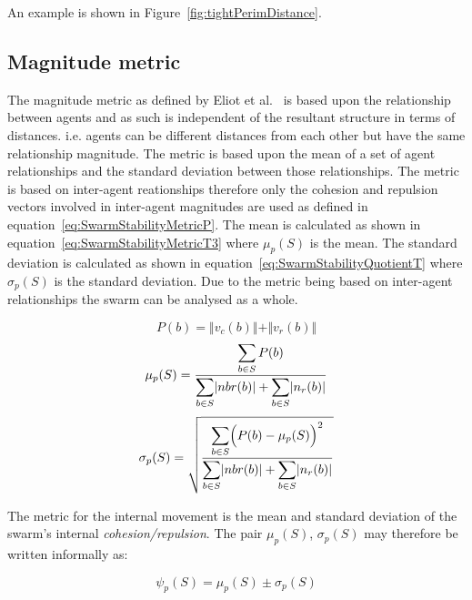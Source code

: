 \documentclass[12pt,a4paper]{IEEEtran}
\newcommand{\magn}[1]{\Vert{#1}\Vert}
\newcommand{\card}[1]{\vert{#1}\vert}
\begin{document}
An example is shown in Figure~\ref{fig:tightPerimDistance}.

\subsection{Magnitude metric}
The magnitude metric as defined by Eliot et al.~\cite{eliot2018metric} is based upon the relationship between agents and as such is independent of the resultant structure in terms of distances. i.e. agents can be different distances from each other but have the same relationship magnitude.
The metric is based upon the mean of a set of agent relationships and the standard deviation between those relationships. The metric is based on inter-agent reationships therefore only the cohesion and repulsion vectors involved in inter-agent magnitudes are used as defined in equation~\ref{eq:SwarmStabilityMetricP}. The mean is calculated as shown in equation~\ref{eq:SwarmStabilityMetricT3} where $\mu_p(S)$ is the mean. The standard deviation is calculated as shown in equation~\ref{eq:SwarmStabilityQuotientT} where $\sigma_p(S)$ is the standard deviation. Due to the metric being based on inter-agent relationships the swarm can be analysed as a whole.

\small
\begin{equation}\label{eq:SwarmStabilityMetricP}
	P(b) = \magn{v_c(b)} + \magn{v_r(b)}
\end{equation}
\begin{equation}\label{eq:SwarmStabilityMetricT3}
	\mu_p(S) = \frac{\mathlarger{\sum_{b \in S} P(b)}}{\mathlarger{\sum_{b \in S}}\card{nbr(b)} + \mathlarger{\sum_{b \in S}}\card{n_r(b)}}
\end{equation}
\begin{equation}\label{eq:SwarmStabilityQuotientT}
	\sigma_p(S) = \sqrt{\frac{\mathlarger{\sum_{b \in S}}\Big(P(b)-\mu_p(S)\Big)^2}{\mathlarger{\sum_{b \in S}}\card{nbr(b)} + \mathlarger{\sum_{b \in S}}\card{n_r(b)}}}
\end{equation}
\normalsize

The metric for the internal movement is the mean and standard deviation of the swarm's internal \emph{cohesion/repulsion}. The pair $\mu_p(S)$, $\sigma_p(S)$ may therefore be written informally as: 

\small
\begin{equation}
\label{eq:SwarmMagnitudeMatric}
\psi_p(S) = \mu_p(S)\pm \sigma_p(S)
\end{equation}
\normalsize
\end{document}
